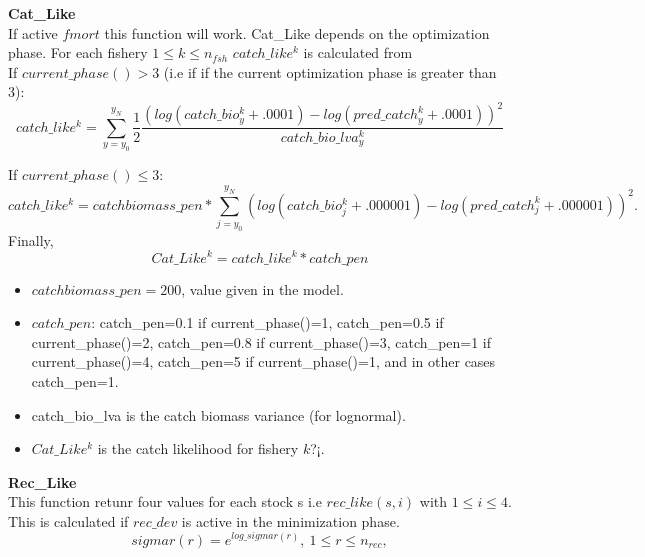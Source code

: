 \documentclass{article}
\begin{document}
\textbf{Cat\_Like}\\
If active $fmort$ this function will work.
Cat\_Like depends on the optimization phase. For each fishery $ 1\leq k \leq n_{fsh}$ $catch\_like^k$ is calculated from\\

If $current\_phase()>3$ (i.e if if the current optimization phase is greater than 3):
    \begin{equation}
        catch\_like^k = \sum_{y=y_0}^{y_N}\dfrac{1}{2}\dfrac{(log(catch\_bio^k_y+.0001) - log(pred\_catch^k_y+.0001) )^2}{catch\_bio\_lva^k_y}
    \end{equation}
    
If $current\_phase()\leq 3$:
    \begin{equation}
        catch\_like^k =  catchbiomass\_pen*\sum_{j=y_0}^{y_N}(log(catch\_bio^k_j  +.000001) - log(pred\_catch^k_j +.000001))^2.
    \end{equation}
    Finally, 
    \begin{equation}
        Cat\_Like^k = catch\_like^k*catch\_pen 
    \end{equation}
    
    \begin{itemize}
        \item $catchbiomass\_pen=200$, value given in the model.
        \item $catch\_pen$: catch\_pen=0.1 if current\_phase()=1, catch\_pen=0.5 if current\_phase()=2, catch\_pen=0.8 if current\_phase()=3, catch\_pen=1 if current\_phase()=4, catch\_pen=5 if current\_phase()=1, and in other cases catch\_pen=1.
        \item catch\_bio\_lva is the catch biomass variance (for lognormal).
        \item $Cat\_Like^k$ is the catch likelihood for fishery $k$?¡.
    \end{itemize}


\textbf{Rec\_Like}\\
This function retunr four values for each stock s i.e $rec\_like(s,i)$ with $1\leq i \leq 4$.
This is calculated if $rec\_dev$ is active in the minimization phase.\\
\begin{equation}
    sigmar(r)=e^{log\_sigmar(r)}, \ 1\leq r \leq n_{rec},
\end{equation}
\end{document}
